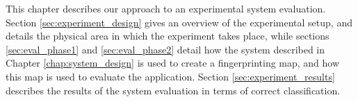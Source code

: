 This chapter describes our approach to an experimental system evaluation.
Section \ref{sec:experiment_design} gives an overview of the experimental setup, and details the physical area in which the experiment takes place, while sections \ref{sec:eval_phase1} and \ref{sec:eval_phase2} detail how the system described in Chapter \ref{chap:system_design} is used to create a fingerprinting map, and how this map is used to evaluate the application.
Section \ref{sec:experiment_results} describes the results of the system evaluation in terms of correct classification.